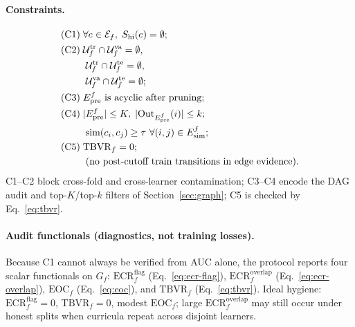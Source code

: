 \documentclass[pdflatex,sn-basic]{sn-jnl}
\newcommand{\Epre}{\ensuremath{E_{\text{pre}}}}
\newcommand{\Esim}{\ensuremath{E_{\text{sim}}}}
\begin{document}
\paragraph{Constraints.}
\begin{align}
\text{(C1)} \;& \forall e\in\mathcal{E}_f,\;
  S_{\mathrm{hi}}(e)=\emptyset;
  \label{eq:c1}\\
\text{(C2)} \;& \mathcal{U}^{\mathrm{tr}}_f \cap \mathcal{U}^{\mathrm{va}}_f
  = \emptyset,\notag\\
&\; \mathcal{U}^{\mathrm{tr}}_f \cap \mathcal{U}^{\mathrm{te}}_f
  = \emptyset,\notag\\
&\; \mathcal{U}^{\mathrm{va}}_f \cap \mathcal{U}^{\mathrm{te}}_f
  = \emptyset;
  \label{eq:c2}\\
\text{(C3)} \;& \Epre^f \text{ is acyclic after pruning};
  \label{eq:c3}\\
\text{(C4)} \;& |\Epre^f|\le K,\;
  |\mathrm{Out}_{\Epre^f}(i)|\le k;\notag\\
&\; \mathrm{sim}(c_i,c_j)\ge\tau \ \forall (i,j)\in\Esim^f;
  \label{eq:c4}\\
\text{(C5)} \;& \mathrm{TBVR}_f = 0;\notag\\
&\;\text{(no post-cutoff train transitions in edge evidence).}
  \label{eq:c5}
\end{align}
C1--C2 block cross-fold and cross-learner contamination; C3--C4 encode
the DAG audit and top-$K$/top-$k$ filters of Section~\ref{sec:graph};
C5 is checked by Eq.~\eqref{eq:tbvr}.

\paragraph{Audit functionals (diagnostics, not training losses).}
Because C1 cannot always be verified from AUC alone, the protocol
reports four scalar functionals on $G_f$:
$\mathrm{ECR}^{\mathrm{flag}}_f$ (Eq.~\eqref{eq:ecr-flag}),
$\mathrm{ECR}^{\mathrm{overlap}}_f$ (Eq.~\eqref{eq:ecr-overlap}),
$\mathrm{EOC}_f$ (Eq.~\eqref{eq:eoc}), and
$\mathrm{TBVR}_f$ (Eq.~\eqref{eq:tbvr}).
Ideal hygiene: $\mathrm{ECR}^{\mathrm{flag}}_f{=}0$,
$\mathrm{TBVR}_f{=}0$, modest $\mathrm{EOC}_f$; large
$\mathrm{ECR}^{\mathrm{overlap}}_f$ may still occur under honest splits
when curricula repeat across disjoint learners.
\end{document}
